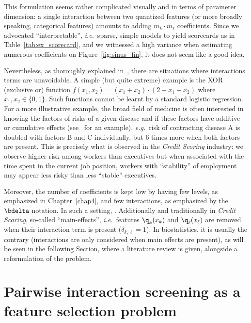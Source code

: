 This formulation seems rather complicated visually and in terms of parameter dimension: a single interaction between two quantized features (or more broadly speaking, categorical features) amounts to adding $m_k \cdot m_\ell$ coefficients. Since we advocated ``interpretable'', \textit{i.e.}\ sparse, simple models to yield scorecards as in Table~\ref{tab:ex_scorecard}, and we witnessed a high variance when estimating numerous coefficients on Figure~\ref{fig:sinus_fin}, it does not seem like a good idea.

Nevertheless, as thoroughly explained in~\cite{berry2010testing}, there are situations where interactions terms are unavoidable. A simple (but quite extreme) example is the XOR (exclusive or) function $f(x_1,x_2) = (x_1 + x_2)\cdot(2 - x_1 - x_2)$ where $x_1,x_2 \in \{0,1\}$. Such functions cannot be learnt by a standard logistic regression. For a more illustrative example, the broad field of medicine is often interested in knowing the factors of risks of a given disease and if these factors have additive or cumulative effects (see~\cite{morgan2014adversity} for an example), \textit{e.g.}\ risk of contracting disease A is doubled with factors B and C individually, but 6 times more when both factors are present. This is precisely what is observed in the \textit{Credit Scoring} industry: we observe higher risk among workers than executives but when associated with the time spent in the current job position, workers with ``stability'' of employment may appear less risky than less ``stable'' executives.

Moreover, the number of coefficients is kept low by having few levels, as emphasized in Chapter~\ref{chap4}, and few interactions, as emphasized by the $\bdelta$ notation. In such a setting, . Additionally and traditionally in \textit{Credit Scoring}, so-called ``main-effects'', \textit{i.e.}\ features $\q_k(x_k)$ and $\q_\ell(x_\ell)$ are removed when their interaction term is present ($\delta_{k,\ell} = 1$). In biostatistics, it is usually the contrary (interactions are only considered when main effects are present), as will be seen in the following Section, where a literature review is given, alongside a reformulation of the problem.


\section{Pairwise interaction screening as a feature selection problem}

